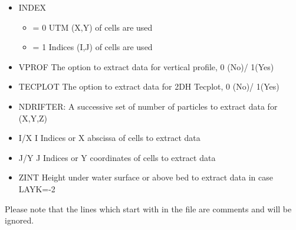 \documentclass[letterpaper,10pt,english]{sphinxmanual}
\begin{document}
\begin{itemize}
\begin{itemize}
\end{itemize}

\item {} 
INDEX
\begin{itemize}
\item {} 
= 0 UTM (X,Y) of cells are used

\item {} 
= 1 Indices (I,J) of cells are used

\end{itemize}

\item {} 
VPROF The option to extract data for vertical profile, 0 (No)/ 1(Yes)

\item {} 
TECPLOT The option to extract data for 2DH Tecplot, 0 (No)/ 1(Yes)

\item {} 
NDRIFTER: A successive set of number of particles to extract data for (X,Y,Z)

\item {} 
I/X I Indices or X abscissa of cells to extract data

\item {} 
J/Y J Indices or Y coordinates of cells to extract data

\item {} 
ZINT Height under water surface or above bed to extract data in case LAYK=-2

\end{itemize}

Please note that the lines which start with \sphinxtitleref{**} in the  file are comments and
will be ignored.
\end{document}
